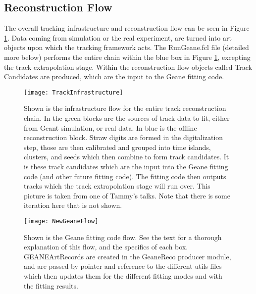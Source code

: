   \subsection{Reconstruction Flow}

    The overall tracking infrastructure and reconstruction flow can be seen in Figure \ref{fig:Infrastructure}. Data coming from simulation or the real experiment, are turned into art objects upon which the tracking framework acts. The RunGeane.fcl file (detailed more below) performs the entire chain within the blue box in Figure \ref{fig:Infrastructure}, excepting the track extrapolation stage. Within the reconstruction flow objects called Track Candidates are produced, which are the input to the Geane fitting code.


\begin{figure}[]
\caption{Shown is the infrastructure flow for the entire track reconstruction chain. In the green blocks are the sources of track data to fit, either from Geant simulation, or real data. In blue is the offline reconstruction block. Straw digits are formed in the digitalization step, those are then calibrated and grouped into time islands, clusters, and seeds which then combine to form track candidates. It is these track candidates which are the input into the Geane fitting code (and other future fitting code). The fitting code then outputs tracks which the track extrapolation stage will run over. This picture is taken from one of Tammy's talks. Note that there is some iteration here that is not shown.}
\centering
\texttt{[image: TrackInfrastructure]}
\label{fig:Infrastructure}
\end{figure}

\begin{figure}[]
\caption{Shown is the Geane fitting code flow. See the text for a thorough explanation of this flow, and the specifics of each box. GEANEArtRecords are created in the GeaneReco producer module, and are passed by pointer and reference to the different utils files which then updates them for the different fitting modes and with the fitting results.}
\centering
\hspace{15mm}
\texttt{[image: NewGeaneFlow]}
\label{fig:NewGeaneFlow}
\end{figure}


